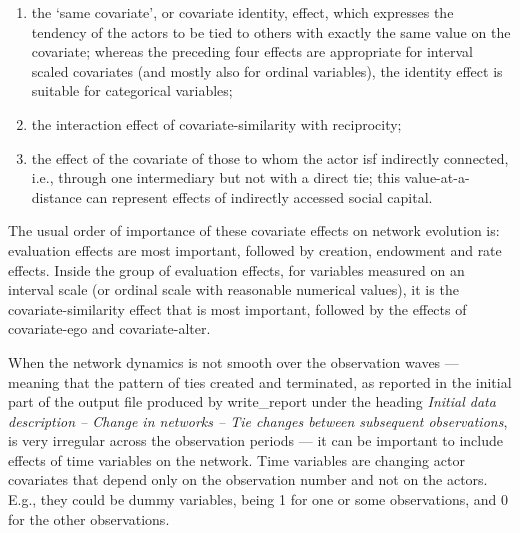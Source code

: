 \documentclass[a4paper,fleqn,11pt]{article}
\newcommand{\+}{\, + \,}
\newcommand{\sfn}[1]{\textsf{#1}}
\begin{document}
\begin{itemize}
\begin{enumerate}
      of ego and of the other actor (covariate ego $\times$ covariate alter);
      a positive effect here means, just like a positive similarity effect,
      that actors with a higher value on the covariate
      will prefer ties to others who likewise have a relatively high
      value;
      when used together with the alter effect of the squared variable
      this effect is quite analogous to the similarity effect,
      and for dichotomous covariates, in models where the ego and
      alter effects are also included, it even is equivalent
      to the similarity effect (although expressed differently),
      and then the squared alter effect is superfluous;
\item the `same covariate', or covariate identity, effect, which expresses the tendency of the
      actors to be tied to others with exactly the same value on the covariate;
      whereas the preceding four effects are appropriate for interval scaled
      covariates (and mostly also for ordinal variables),
      the identity effect is suitable for categorical variables;
\item the interaction effect of covariate-similarity with reciprocity;
\item the effect of the covariate of those to whom the actor isf
      indirectly connected, i.e., through one intermediary but not
      with a direct tie; this value-at-a-distance can represent
      effects of indirectly accessed social capital.
\end{enumerate}
\end{itemize}
The usual order of importance of these covariate effects on
network evolution is: evaluation effects are most important, followed
by creation, endowment and rate effects. Inside the group of evaluation
effects, for variables measured on an interval scale
(or ordinal scale with reasonable numerical values),
it is the covariate-similarity effect that is most
important, followed by the effects of covariate-ego and
covariate-alter.

When the network dynamics is not smooth over the observation waves --- meaning that
the pattern of ties created and terminated, as reported in the initial part of the
output file produced by \sfn{write\_report}
under the heading \emph{Initial data description -- Change in networks --
Tie changes between subsequent observations},
is very irregular across the observation periods --- it can be important to include
effects of time variables on the network.
Time variables are changing actor covariates that depend only on the
observation number and not on the actors. E.g., they could be dummy variables,
being 1 for one or some observations, and 0 for the other observations.
\end{document}
